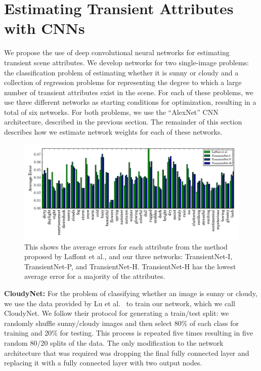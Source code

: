 \documentclass[10pt,twocolumn,letterpaper]{article}
\begin{document}
\section{Estimating Transient Attributes with CNNs}
We propose the use of deep convolutional neural networks for estimating transient
scene attributes. We develop networks for two single-image problems: the
classification problem of estimating whether it is sunny or cloudy and a
collection of regression problems for representing the degree to which a large
number of transient attributes exist in the scene.  For each of these problems,
we use three different networks as starting conditions for optimization,
resulting in a total of six networks.  For both problems, we use the
``AlexNet'' CNN architecture, described in the previous section.  The remainder
of this section describes how we estimate network weights for each of these
networks.

\begin{figure}[t!]
	\centering
		\includegraphics[width=1.0\textwidth, trim= 0 4mm 0 0]{figs/avg_err_compare.pdf}
		\caption{This shows the average errors for each attribute from the method proposed
						 by Laffont et al., and our three networks: TransientNet-I, TransientNet-P,
             and TransientNet-H.  TransientNet-H has the lowest average error for a 
             majority of the attributes.}
		\label{fig:compare}
\end{figure}

\textbf{CloudyNet:} For the problem of classifying whether an image is sunny or
cloudy, we use the data provided by Lu et al.~\cite{lutwoclass} to train our
network, which we call CloudyNet.  We follow their protocol for
generating a train/test split: we randomly shuffle sunny/cloudy images
and then select 80\% of each class for training and 20\% for testing.
This process is repeated five times resulting in five random 80/20
splits of the data. 
The only modification to the network architecture that was required
was dropping the final fully connected layer and replacing it with a
fully connected layer with two output nodes.
\end{document}
